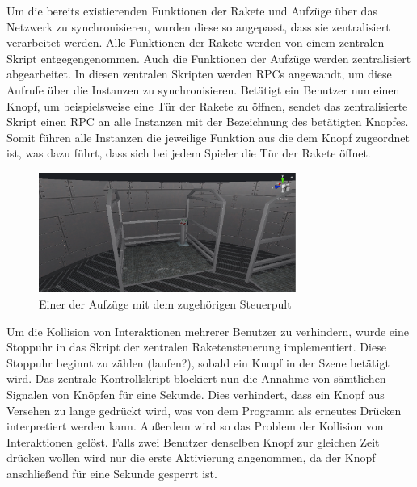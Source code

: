 Um die bereits existierenden Funktionen der Rakete und Aufzüge über das Netzwerk zu synchronisieren, wurden diese so angepasst, dass sie zentralisiert verarbeitet werden. Alle Funktionen der Rakete werden von einem zentralen Skript entgegengenommen. Auch die Funktionen der Aufzüge werden zentralisiert abgearbeitet. In diesen zentralen Skripten werden RPCs angewandt, um diese Aufrufe über die Instanzen zu synchronisieren. Betätigt ein Benutzer nun einen Knopf, um beispielsweise eine Tür der Rakete zu öffnen, sendet das zentralisierte Skript einen RPC an alle Instanzen mit der Bezeichnung des betätigten Knopfes. Somit führen alle Instanzen die jeweilige Funktion aus die dem Knopf zugeordnet ist, was dazu führt, dass sich bei jedem Spieler die Tür der Rakete öffnet.

\begin{figure}[H]
\centering
\includegraphics[width=0.75\textwidth]{Elevator.PNG}
\caption{Einer der Aufzüge mit dem zugehörigen Steuerpult}
\end{figure}

Um die Kollision von Interaktionen mehrerer Benutzer zu verhindern, wurde eine Stoppuhr in das Skript der zentralen Raketensteuerung implementiert. Diese Stoppuhr beginnt zu zählen (laufen?), sobald ein Knopf in der Szene betätigt wird. Das zentrale Kontrollskript blockiert nun die Annahme von sämtlichen Signalen von Knöpfen für eine Sekunde. Dies verhindert, dass ein Knopf aus Versehen zu lange gedrückt wird, was von dem Programm als erneutes Drücken interpretiert werden kann. Außerdem wird so das Problem der Kollision von Interaktionen gelöst. Falls zwei Benutzer denselben Knopf zur gleichen Zeit drücken wollen wird nur die erste Aktivierung angenommen, da der Knopf anschließend für eine Sekunde gesperrt ist.

